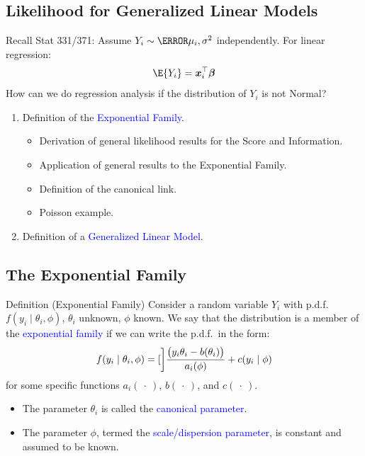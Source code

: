\documentclass[oneside]{book}\usepackage[]{graphicx}\usepackage[svgnames]{xcolor}
\let\exp\relax%
\providecommand{\Vector}[1]{\bm{#1}}%
\begin{document}
\subsection*{Likelihood for Generalized Linear Models}
Recall Stat 331/371: Assume $ Y_i \sim \N{\mu_i,\sigma^2} $ independently. For linear regression:
\[ \E{Y_i}=\Vector{x}_i^\top \Vector{\beta} \]
How can we do regression analysis if the distribution of $Y_i$ is not Normal?
\begin{enumerate}[1.]
      \item Definition of the \textcolor{Blue}{Exponential Family}.
            \begin{itemize}
                  \item Derivation of general likelihood results for the Score and Information.
                  \item Application of general results to the Exponential Family.
                  \item Definition of the canonical link.
                  \item Poisson example.
            \end{itemize}
      \item Definition of a \textcolor{Blue}{Generalized Linear Model}.
\end{enumerate}
\subsection*{The Exponential Family}
\begin{Regular}{Definition (Exponential Family)}
      Consider a random variable $ Y_i $ with p.d.f.\ $ f(y_i\mid \theta_i,\phi) $, $ \theta_i $
      unknown, $ \phi $ known. We say that
      the distribution is a member of the \textcolor{Blue}{exponential family} if we can write the p.d.f.\ in the
      form:
      \[ f(y_i\mid \theta_i,\phi)=\exp[\bigg]{\frac{\bigl(y_i\theta_i-b(\theta_i)\bigr)}{a_i(\phi)}+c(y_i\mid \phi)} \]
      for some specific functions $ a_i(\:\cdot\:) $, $ b(\:\cdot\:) $, and $ c(\:\cdot\:) $.
\end{Regular}
\begin{itemize}
      \item The parameter $ \theta_i $ is called the \textcolor{Blue}{canonical parameter}.
      \item The parameter $ \phi $, termed the \textcolor{Blue}{scale/dispersion parameter}, is constant and assumed
            to be known.
\end{itemize}
\end{document}
